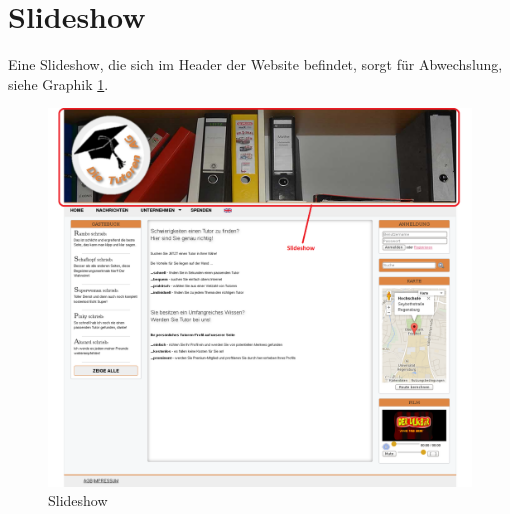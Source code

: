 
\section{Slideshow}


Eine Slideshow, die sich im Header der Website befindet, sorgt für Abwechslung, siehe Graphik \ref{fig:Slideshow}.

\begin{figure}[!htbp]
 \centering
 \includegraphics[width=1\textwidth]{../Screenshots/Slideshow}
 \caption{Slideshow}
 \label{fig:Slideshow}
\end{figure}

